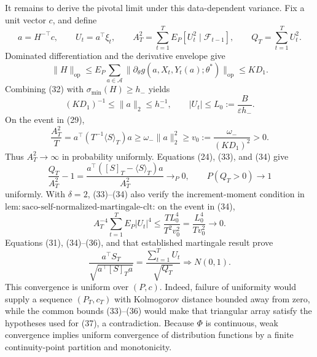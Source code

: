 It remains to derive the pivotal limit under this data-dependent variance. Fix a unit vector \(c\), and define
\[
 a=H^{-\top}c,\qquad U_t=a^\top\xi_t,\qquad
 A_T^2=\sum_{t=1}^TE_P[U_t^2\mid\mathcal F_{t-1}],\qquad
 Q_T=\sum_{t=1}^TU_t^2.
\tag{31}
\]
Dominated differentiation and the derivative envelope give
\[
 \|H\|_{\mathrm{op}}
 \le E_P\sum_{a\in\mathcal A}\|\partial_\theta g(a,X_t,Y_t(a);\theta^*)\|_{\mathrm{op}}
 \le KD_1.
\tag{32}
\]
Combining (32) with \(\sigma_{\min}(H)\ge h_-\) yields
\[
 (KD_1)^{-1}\le\|a\|_2\le h_-^{-1},
 \qquad |U_t|\le L_0:=\frac{B}{\varepsilon h_-}.
\tag{33}
\]
On the event in (29),
\[
 \frac{A_T^2}{T}
 =a^\top(T^{-1}\langle S\rangle_T)a
 \ge\omega_-\|a\|_2^2
 \ge v_0:=\frac{\omega_-}{(KD_1)^2}>0.
\tag{34}
\]
Thus \(A_T^2\to\infty\) in probability uniformly. Equations (24), (33), and (34) give
\[
 \frac{Q_T}{A_T^2}-1
 =\frac{a^\top([S]_T-\langle S\rangle_T)a}{A_T^2}
 \longrightarrow_P0,
 \qquad P(Q_T>0)\longrightarrow1
\tag{35}
\]
uniformly. With \(\delta=2\), (33)--(34) also verify the increment-moment condition in \(\mathrm{lem:saco\text{-}self\text{-}normalized\text{-}martingale\text{-}clt}\): on the event in (34),
\[
 A_T^{-4}\sum_{t=1}^TE_P|U_t|^4
 \le \frac{TL_0^4}{T^2v_0^2}
 =\frac{L_0^4}{Tv_0^2}\longrightarrow0.
\tag{36}
\]
Equations (31), (34)--(36), and that established martingale result prove
\[
 \frac{a^\top S_T}{\sqrt{a^\top[S]_Ta}}
 =\frac{\sum_{t=1}^TU_t}{\sqrt{Q_T}}
 \Rightarrow N(0,1).
\tag{37}
\]
This convergence is uniform over \((P,c)\). Indeed, failure of uniformity would supply a sequence \((P_T,c_T)\) with Kolmogorov distance bounded away from zero, while the common bounds (33)--(36) would make that triangular array satisfy the hypotheses used for (37), a contradiction. Because \(\Phi\) is continuous, weak convergence implies uniform convergence of distribution functions by a finite continuity-point partition and monotonicity.

